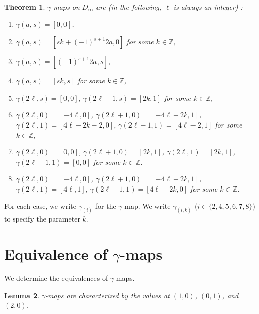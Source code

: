 \documentclass[12pt]{amsart}
\newtheorem{thm}{Theorem}[section]
\newtheorem{lemm}[thm]{Lemma}
\theoremstyle{definition}
\newcommand{\Z}{\mathbb{Z}}
\begin{document}
\begin{thm}
  $\gamma$-maps on $D_\infty$ are
  (in the following, $\ell$ is always an integer) :
  \begin{enumerate}[{\rm (1)}]
    \item
    $\gamma(a,s)=[0,0]$,
    \item
    $\gamma(a,s)=[sk+(-1)^{s+1}2a,0]$ for some $k\in \Z$,
    \item
    $\gamma(a,s)=[(-1)^{s+1}2a,s]$,
    \item
    $\gamma(a,s)=[sk,s]$ for some $k\in \Z$,
    \item 
    $\gamma(2\ell,s)=[0,0]$,
    $\gamma(2\ell+1,s)=[2k,1]$
    for some $k\in \Z$,
    \item
    $\gamma(2\ell,0)=[-4\ell,0]$,
    $\gamma(2\ell+1,0)=[-4\ell+2k,1]$,
    $\gamma(2\ell,1)=[4\ell-2k-2,0]$,
    $\gamma(2\ell-1,1)=[4\ell-2,1]$
    for some $k\in \Z$,
    \item
    $\gamma(2\ell,0)=[0,0]$,
    $\gamma(2\ell+1,0)=[2k,1]$,
    $\gamma(2\ell,1)=[2k,1]$,
    $\gamma(2\ell-1,1)=[0,0]$
    for some $k\in \Z$.
    \item
    $\gamma(2\ell,0)=[-4\ell,0]$,
    $\gamma(2\ell+1,0)=[-4\ell+2k,1]$,
    $\gamma(2\ell,1)=[4\ell,1]$,
    $\gamma(2\ell+1,1)=[4\ell-2k,0]$
    for some $k\in \Z$.
  \end{enumerate}
\end{thm}

For each case, we write $\gamma_{(i)}$ for the $\gamma$-map.
We write  $\gamma_{(i,k)}$ ($i\in\{2, 4, 5, 6, 7, 8\}$)
to specify the parameter $k$.

\section{Equivalence of $\gamma$-maps}
We determine the equivalences of $\gamma$-maps.

\begin{lemm}\label{lemCindy}
  $\gamma$-maps are characterized by the values at
  $(1,0)$, $(0,1)$, and $(2,0)$.
\end{lemm}
\end{document}
